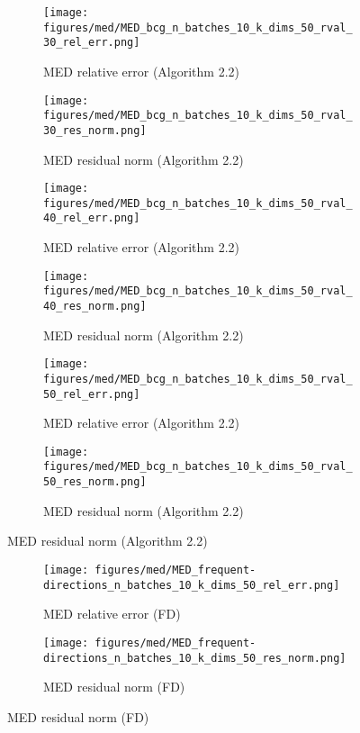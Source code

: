 \begin{figure}\ContinuedFloat
  \begin{subfigure}[b]{0.48\textwidth}
    \centering
    \texttt{[image: figures/med/MED\_bcg\_n\_batches\_10\_k\_dims\_50\_rval\_30\_rel\_err.png]}
    \caption{MED relative error (Algorithm 2.2)}
  \end{subfigure}
  \hfill
  \begin{subfigure}[b]{0.48\textwidth}
    \centering
    \texttt{[image: figures/med/MED\_bcg\_n\_batches\_10\_k\_dims\_50\_rval\_30\_res\_norm.png]}
    \caption{MED residual norm (Algorithm 2.2)}
  \end{subfigure}
    \begin{subfigure}[b]{0.48\textwidth}
    \centering
    \texttt{[image: figures/med/MED\_bcg\_n\_batches\_10\_k\_dims\_50\_rval\_40\_rel\_err.png]}
    \caption{MED relative error (Algorithm 2.2)}
  \end{subfigure}
  \hfill
  \begin{subfigure}[b]{0.48\textwidth}
    \centering
    \texttt{[image: figures/med/MED\_bcg\_n\_batches\_10\_k\_dims\_50\_rval\_40\_res\_norm.png]}
    \caption{MED residual norm (Algorithm 2.2)}
  \end{subfigure}
    \begin{subfigure}[b]{0.48\textwidth}
    \centering
    \texttt{[image: figures/med/MED\_bcg\_n\_batches\_10\_k\_dims\_50\_rval\_50\_rel\_err.png]}
    \caption{MED relative error (Algorithm 2.2)}
  \end{subfigure}
  \hfill
  \begin{subfigure}[b]{0.48\textwidth}
    \centering
    \texttt{[image: figures/med/MED\_bcg\_n\_batches\_10\_k\_dims\_50\_rval\_50\_res\_norm.png]}
    \caption{MED residual norm (Algorithm 2.2)}
  \end{subfigure}
 \end{figure}
 
 \begin{figure}\ContinuedFloat
  \begin{subfigure}[b]{0.48\textwidth}
    \centering
    \texttt{[image: figures/med/MED\_frequent-directions\_n\_batches\_10\_k\_dims\_50\_rel\_err.png]}
    \caption{MED relative error (FD)}
  \end{subfigure}
  \hfill
  \begin{subfigure}[b]{0.48\textwidth}
    \centering
    \texttt{[image: figures/med/MED\_frequent-directions\_n\_batches\_10\_k\_dims\_50\_res\_norm.png]}
    \caption{MED residual norm (FD)}
  \end{subfigure}
\end{figure}